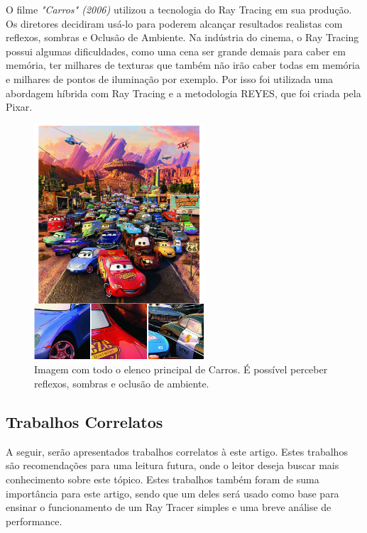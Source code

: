 \documentclass[journal]{IEEEtran}
\begin{document}
O filme \emph{"Carros" (2006)} utilizou a tecnologia do Ray Tracing em sua produção.
Os diretores decidiram usá-lo para poderem alcançar resultados realistas com reflexos,
sombras e Oclusão de Ambiente. Na indústria do cinema, o Ray Tracing possui algumas
dificuldades, como uma cena ser grande demais para caber em memória, ter milhares
de texturas que também não irão caber todas em memória e milhares de pontos de iluminação
por exemplo. Por isso foi utilizada uma abordagem híbrida com Ray Tracing e a metodologia
REYES, que foi criada pela Pixar.
\cite{c9}

\begin{figure}[!t]
  \centering
  \includegraphics[width=2.5in]{media/carros.png}
  \caption{Imagem com todo o elenco principal de Carros. É possível perceber reflexos, sombras e oclusão de ambiente. \cite{c9}}
  \label{img_carros}
\end{figure}

\subsection{Trabalhos Correlatos}
A seguir, serão apresentados trabalhos correlatos à este artigo. Estes trabalhos
são recomendações para uma leitura futura, onde o leitor deseja buscar mais
conhecimento sobre este tópico. Estes trabalhos também foram de suma importância
para este artigo, sendo que um deles será usado como base para ensinar o
funcionamento de um Ray Tracer simples e uma breve análise de performance.
\end{document}
